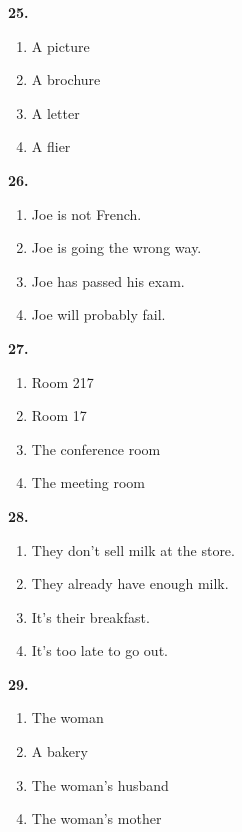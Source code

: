 \documentclass[12pt]{article}
\begin{document}
\par
\vspace{0.25\baselineskip}
\noindent\textbf{25.}
\begin{enumerate}[label=(\Alph*),leftmargin=*,itemsep=0.2em]
\item A picture
\item A brochure
\item A letter
\item A flier
\end{enumerate}
\par
\vspace{0.25\baselineskip}
\noindent\textbf{26.}
\begin{enumerate}[label=(\Alph*),leftmargin=*,itemsep=0.2em]
\item Joe is not French.
\item Joe is going the wrong way.
\item Joe has passed his exam.
\item Joe will probably fail.
\end{enumerate}
\par
\vspace{0.25\baselineskip}
\noindent\textbf{27.}
\begin{enumerate}[label=(\Alph*),leftmargin=*,itemsep=0.2em]
\item Room 217
\item Room 17
\item The conference room
\item The meeting room
\end{enumerate}
\par
\vspace{0.25\baselineskip}
\noindent\textbf{28.}
\begin{enumerate}[label=(\Alph*),leftmargin=*,itemsep=0.2em]
\item They don't sell milk at the store.
\item They already have enough milk.
\item It's their breakfast.
\item It's too late to go out.
\end{enumerate}
\par
\vspace{0.25\baselineskip}
\noindent\textbf{29.}
\begin{enumerate}[label=(\Alph*),leftmargin=*,itemsep=0.2em]
\item The woman
\item A bakery
\item The woman's husband
\item The woman's mother
\end{enumerate}
\end{document}
